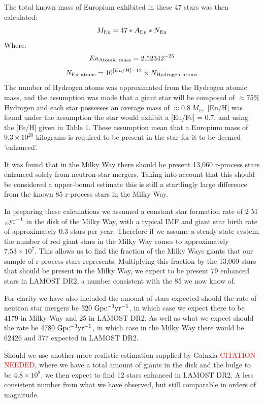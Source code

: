 \documentclass[a4paper,fleqn,usenatbib]{mnras}
\newcommand{\todo}[1]{\textcolor{red}{#1}}
\begin{document}
	The total known mass of Europium exhibited in these 47 stars was then calculated:
	\begin{equation}
	M_{\rm{Eu}} = 47*A_{\textrm{Eu}}*N_{\textrm{Eu}}
	\end{equation}
	Where:
	\begin{equation}
	Eu_{\rm{Atomic\ mass}} = 2.52342^{-25}
	\end{equation}
	\begin{equation}
	N_{\rm{Eu\ atoms}} = 10^{[Eu/H]-12} \times N_{\rm{Hydrogen\ atoms}}
	\end{equation}
	The number of Hydrogen atoms was approximated from the Hydrogen atomic mass, and the assumption was made that a giant star will be composed of $\approx$75\% Hydrogen and each star possesses an average mass of $\approx 0.8\ M_{\odot}$. [Eu/H] was found under the assumption the star would exhibit a [Eu/Fe] = 0.7, and using the [Fe/H] given in Table 1. These assumption mean that a Europium mass of $9.3 \times 10^{20}$ kilograms is required to be present in the star for it to be deemed 'enhanced'.
	
    It was found that in the Milky Way there should be present 13,060 r-process stars enhanced solely from neutron-star mergers. Taking into account that this should be considered a upper-bound estimate this is still a startlingly large difference from the known 85 r-process stars in the Milky Way.
    
    In preparing these calculations we assumed a constant star formation rate of 2 M$_\odot {\rm yr}^{-1}$ in the disk of the Milky Way, with a typical IMF and giant star birth rate of approximately 0.3 stars per year. Therefore if we assume a steady-state system, the number of red giant stars in the Milky Way comes to approximately $7.53\times10^7$. This allows us to find the fraction of the Milky Ways giants that our sample of r-process stars represents. Multiplying this fraction by the 13,060 stars that should be present in the Milky Way, we expect to be present 79 enhanced stars in LAMOST DR2, a number consistent with the 85 we now know of.
    
    For clarity we have also included the amount of stars expected should the rate of neutron star mergers be $320\ \rm{Gpc^{-3}yr^{-1}}$, in which case we expect there to be 4179 in Milky Way and 25 in LAMOST DR2. As well as what we expect should the rate be $4780\ \rm{Gpc^{-3}yr^{-1}}$, in which case in the Milky Way there would be 62426 and 377 expected in LAMOST DR2.
    
    Should we use another more realistic estimation supplied by Galaxia \todo{CITATION NEEDED}, where we have a total amount of giants in the disk and the bulge to be $4.8\times10^8$, we then expect to find 12 stars enhanced in LAMOST DR2. A less consistent number from what we have observed, but still comparable in orders of magnitude.
    
\end{document}
